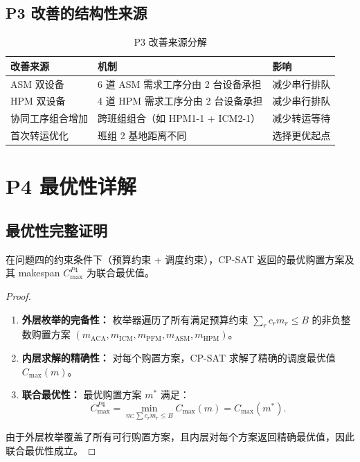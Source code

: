 \documentclass[UTF8,a4paper,12pt]{ctexart}
\begin{document}
\subsection{P3 改善的结构性来源}
\begin{table}[htbp]
  \centering
  \caption{P3 改善来源分解}
  \label{tab:p3_improvement}
  \begin{tabular}{lll}
    \toprule
    改善来源 & 机制 & 影响 \\
    \midrule
    ASM 双设备 & 6 道 ASM 需求工序分由 2 台设备承担 & 减少串行排队 \\
    HPM 双设备 & 4 道 HPM 需求工序分由 2 台设备承担 & 减少串行排队 \\
    协同工序组合增加 & 跨班组组合（如 HPM1-1 + ICM2-1） & 减少转运等待 \\
    首次转运优化 & 班组 2 基地距离不同 & 选择更优起点 \\
    \bottomrule
  \end{tabular}
\end{table}

\section{P4 最优性详解}
\subsection{最优性完整证明}
\begin{theorem}[P4 最优性]
在问题四的约束条件下（预算约束 + 调度约束），CP-SAT 返回的最优购置方案及其 makespan $C_{\max}^{P4}$ 为联合最优值。
\end{theorem}

\begin{proof}
\begin{enumerate}
  \item \textbf{外层枚举的完备性：} 枚举器遍历了所有满足预算约束 $\sum_r c_r m_r \leq B$ 的非负整数购置方案 $(m_{\text{ACA}}, m_{\text{ICM}}, m_{\text{PFM}}, m_{\text{ASM}}, m_{\text{HPM}})$。
  \item \textbf{内层求解的精确性：} 对每个购置方案，CP-SAT 求解了精确的调度最优值 $C_{\max}(m)$。
  \item \textbf{联合最优性：} 最优购置方案 $m^*$ 满足：
  \begin{equation}
  C_{\max}^{P4} = \min_{m : \sum c_r m_r \leq B} C_{\max}(m) = C_{\max}(m^*). \tag{11-4}
  \end{equation}
\end{enumerate}
由于外层枚举覆盖了所有可行购置方案，且内层对每个方案返回精确最优值，因此联合最优性成立。
\end{proof}
\end{document}
